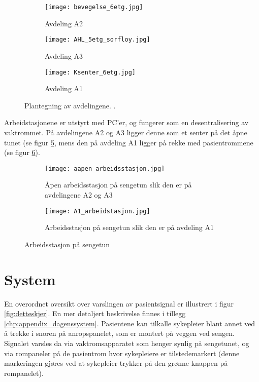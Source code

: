 \begin{figure}[H]
        \centering
        \begin{subfigure}[b]{1.0\textwidth}
        		\centering
				\texttt{[image: bevegelse\_6etg.jpg]}
				\caption{Avdeling A2}
				\label{fig:Bevegelse}
        \end{subfigure}
        
        \begin{subfigure}[b]{1.0\textwidth}
        		\centering
				\texttt{[image: AHL\_5etg\_sorfloy.jpg]}
				\caption{Avdeling A3}
				\label{fig:AHL}
        \end{subfigure}
        
        \begin{subfigure}[b]{1.0\textwidth}
        		\centering
				\texttt{[image: Ksenter\_6etg.jpg]}
				\caption{Avdeling A1}
				\label{fig:Ksenter}		
        \end{subfigure}
        \caption{Plantegning av avdelingene. \citep{sykehuskart}.}
        \label{Plantegninger}
\end{figure}

\noindent
Arbeidstasjonene er utstyrt med PC'er, og fungerer som en desentralisering av vaktrommet. På avdelingene A2 og A3 ligger denne som et senter på det åpne tunet (se figur \ref{fig:aapen_arbeidsstasjon}, mens den på avdeling A1 ligger på rekke med pasientrommene (se figur \ref{fig:A1_arbeidsstasjon}).

\begin{figure}[H]
\centering
	\begin{subfigure}[b]{1.0\textwidth}
		\centering
		\texttt{[image: aapen\_arbeidsstasjon.jpg]}
		\caption{Åpen arbeidsstasjon på sengetun slik den er på avdelingene A2 og A3 			\citep{sykehuskart}}
		\label{fig:aapen_arbeidsstasjon}
	\end{subfigure}
	
	\begin{subfigure}[b]{1.0\textwidth}
		\centering
		\texttt{[image: A1\_arbeidstasjon.jpg]}
		\caption{Arbeidsstasjon på sengetun slik den er på avdeling A1 							\citep{sykehuskart}}
		\label{fig:A1_arbeidsstasjon}
	\end{subfigure}
\caption{Arbeidsstasjon på sengetun}
\label{fig:arbeidsstasjon}
\end{figure}


\section{System}
En overordnet oversikt over varslingen av pasientsignal er illustrert i figur \ref{fig:detteskjer}. En mer detaljert beskrivelse finnes i tillegg \ref{chp:appendix_dagenssystem}.
Pasientene kan tilkalle sykepleier blant annet ved å trekke i snoren på anropspanelet, som er montert på veggen ved sengen. Signalet varsles da via vaktromsapparatet som henger synlig på sengetunet, og via rompaneler på de pasientrom hvor sykepleiere er tilstedemarkert (denne markeringen gjøres ved at sykepleier trykker på den grønne knappen på rompanelet). 

